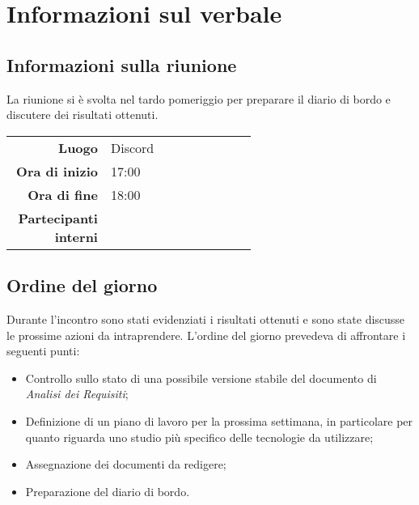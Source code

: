 \section{Informazioni sul verbale}

\subsection{Informazioni sulla riunione}
La riunione si è svolta nel tardo pomeriggio per preparare il diario di bordo e discutere dei risultati ottenuti.

\begin{center}
	\begin{tabular}{r|p{0.6\linewidth}}
		\toprule
		\textbf{Luogo} & Discord \\
		\textbf{Ora di inizio} & 17:00 \\
		\textbf{Ora di fine} & 18:00 \\
		\textbf{Partecipanti interni} & \groupTeam
	\end{tabular}
\end{center}

\medskip

\subsection{Ordine del giorno}
Durante l'incontro sono stati evidenziati i risultati ottenuti e sono state discusse le prossime azioni da intraprendere. L'ordine del giorno prevedeva di affrontare i seguenti punti:
\begin{itemize}
	\item Controllo sullo stato di una possibile versione stabile del documento di \textit{Analisi dei Requisiti};
	\item Definizione di un piano di lavoro per la prossima settimana, in particolare per quanto riguarda uno studio più specifico delle tecnologie da utilizzare;
	\item Assegnazione dei documenti da redigere;
	\item Preparazione del diario di bordo.
\end{itemize}
